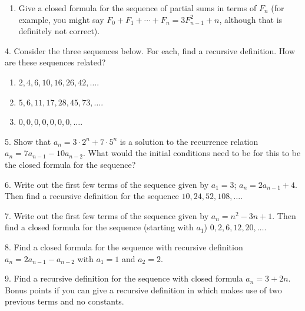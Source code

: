 \documentclass[12pt,]{book}
\theoremstyle{plain}
\theoremstyle{definition}
\theoremstyle{definition}
\theoremstyle{definition}
\numberwithin{equation}{chapter}
\begin{document}
\begin{exerciselist}
\begin{enumerate}[label=(\alph*)]
\item\hypertarget{li-64}{}\hypertarget{p-89}{}%
Give a closed formula for the sequence of partial sums in terms of \(F_n\)\label{notation-3}
 (for example, you might say \(F_0 + F_1 + \cdots + F_n = 3F_{n-1}^2 + n\), although that is definitely not correct).%
\end{enumerate}
%
\par\smallskip
\item[4.]\hypertarget{exercise-4}{}\hypertarget{p-91}{}%
Consider the three sequences below. For each, find a recursive definition. How are these sequences related?%
\par
\hypertarget{p-92}{}%
\leavevmode%
\begin{enumerate}[label=(\alph*)]
\item\hypertarget{li-68}{}\(2, 4, 6, 10, 16, 26, 42, \ldots\).%
\item\hypertarget{li-69}{}\(5, 6, 11, 17, 28, 45, 73, \ldots\).%
\item\hypertarget{li-70}{}\(0, 0 , 0 , 0 , 0 , 0 , 0 ,\ldots\).%
\end{enumerate}
%
\par\smallskip
\item[5.]\hypertarget{exercise-5}{}\hypertarget{p-94}{}%
Show that \(a_n = 3\cdot 2^n + 7\cdot 5^n\) is a solution to the recurrence relation \(a_n = 7a_{n-1} - 10a_{n-2}\).   What would the initial conditions need to be for this to be the closed formula for the sequence?%
\par\smallskip
\item[6.]\hypertarget{exercise-6}{}\hypertarget{p-95}{}%
Write out the first few terms of the sequence given by \(a_1 = 3\); \(a_n = 2a_{n-1} + 4\). Then find a recursive definition for the sequence \(10, 24, 52, 108, \ldots\).%
\par\smallskip
\item[7.]\hypertarget{exercise-7}{}\hypertarget{p-96}{}%
Write out the first few terms of the sequence given by \(a_n = n^2 - 3n + 1\). Then find a closed formula for the sequence (starting with \(a_1\)) \(0, 2, 6, 12, 20, \ldots\).%
\par\smallskip
\item[8.]\hypertarget{exercise-8}{}\hypertarget{p-97}{}%
Find a closed formula for the sequence with recursive definition \(a_n = 2a_{n-1} - a_{n-2}\) with \(a_1 = 1\) and \(a_2 = 2\).%
\par\smallskip
\item[9.]\hypertarget{exercise-9}{}\hypertarget{p-98}{}%
Find a recursive definition for the sequence with closed formula \(a_n = 3 + 2n\). Bonus points if you can give a recursive definition in which makes use of two previous terms and no constants.%
\par\smallskip
\end{exerciselist}
\typeout{************************************************}
\typeout{************************************************}
\end{document}
